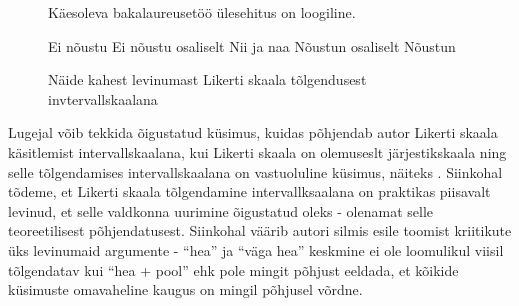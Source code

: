 \documentclass[a4paper,12pt,oneside]{article}
\numberwithin{equation}{section}
\theoremstyle{definition}
\begin{document}
\begin{figure}[H]

\colorbox{background_example}{\parbox{\textwidth}{

\vspace{1mm}

Käesoleva bakalaureusetöö \"ulesehitus on loogiline.

\vspace{5pt}


\begin{Form}
\def\DefaultWidthofChoiceMenu{12pt}%
\small{
\CheckBox[bordercolor = gray,name=optionE1]{\mbox{}} Ei nõustu 
\CheckBox[bordercolor = gray,name=optionD1]{\mbox{}} Ei nõustu osaliselt
\CheckBox[bordercolor = gray,name=optionC1]{\mbox{}} Nii ja naa
\CheckBox[checked,bordercolor = gray,name=optionC1]{\mbox{}}  Nõustun osaliselt
\CheckBox[bordercolor = gray,name=optionC1]{\mbox{}} Nõustun
}
\end{Form}



}}
\caption{Näide kahest levinumast Likerti skaala tõlgendusest invtervallskaalana }
\label{likert_question}
\end{figure}

Lugejal võib tekkida õigustatud k\"usimus, kuidas põhjendab autor Likerti skaala käsitlemist intervallskaalana, kui Likerti skaala on olemuseslt järjestikskaala ning selle tõlgendamises intervallskaalana on vastuoluline küsimus, näiteks \cite{Jamieson2004}. Siinkohal tõdeme, et Likerti skaala tõlgendamine intervallksaalana on praktikas piisavalt levinud, et selle valdkonna uurimine õigustatud oleks - olenamat selle teoreetilisest põhjendatusest.  Siinkohal väärib autori silmis esile toomist kriitikute \"uks levinumaid argumente -  "`hea"'  ja "`väga hea"'  keskmine ei ole  loomulikul viisil tõlgendatav kui "`hea + pool"' ehk pole mingit põhjust eeldada, et kõikide küsimuste omavaheline kaugus on mingil põhjusel võrdne. 
\end{document}
